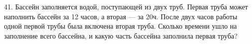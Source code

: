 41. Бассейн заполняется водой, поступающей из двух труб. Первая труба может наполнить бассейн за 12 часов, а вторая --- за 20ч. После двух часов работы одной первой трубы была включена вторая труба. Сколько времени ушло на заполнение всего бассейна, и какую часть бассейна заполнила первая труба?\\
